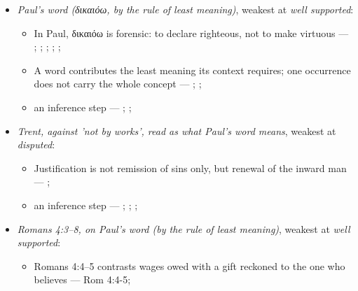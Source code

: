 \documentclass[11pt]{article}
\begin{document}
\begin{itemize}
\begin{itemize}
\item an inference step --- \cite[ad loc. Gal 1:6]{moo-galatians-2013}; \cite[XI.1]{westminster-confession-1647}
\item an inference step --- \cite[XI.1]{westminster-confession-1647}; \cite[III.xi.2]{calvin-institutes-1960}; \cite{morris-apostolic-preaching-1965}
\end{itemize}
\item \emph{Paul's word (δικαιόω, by the rule of least meaning)}, weakest at \emph{well supported}:
\begin{itemize}
\item In Paul, δικαιόω is forensic: to declare righteous, not to make virtuous --- \cite[s.v. δικαιόω]{bauer-danker-lexicon-2000}; \cite{morris-apostolic-preaching-1965}; \cite[p. 80]{moo-romans-1996}; \cite{irons-righteousness-of-god-2015}; \cite{wright-justification-2009}; \cite[ad loc. Rom 3:24]{fitzmyer-romans-1993}
\item A word contributes the least meaning its context requires; one occurrence does not carry the whole concept --- \cite{silva-biblical-words-1994}; \cite{joos-semantic-axiom-1972}; \cite{barr-semantics-2004}
\item an inference step --- \cite{silva-biblical-words-1994}; \cite[p. 80]{moo-romans-1996}; \cite{barr-semantics-2004}
\end{itemize}
\item \emph{Trent, against 'not by works', read as what Paul's word means}, weakest at \emph{disputed}:
\begin{itemize}
\item Justification is not remission of sins only, but renewal of the inward man --- \cite[Trent, Session VI (1547), Decree on Justification, ch. 7]{tanner-decrees-1990}; \cite[Trent, Session VI (1547), canon 11]{tanner-decrees-1990}
\item an inference step --- \cite[Trent, Session VI (1547), Decree on Justification, ch. 8]{tanner-decrees-1990}; \cite[Trent, Session VI (1547), Decree on Justification, ch. 7]{tanner-decrees-1990}; \cite[On the Spirit and the Letter, ch. 45 (26.45)]{npnf1-05-1887}; \cite{mcgrath-iustitia-dei-2005}
\end{itemize}
\item \emph{Romans 4:3–8, on Paul's word (by the rule of least meaning)}, weakest at \emph{well supported}:
\begin{itemize}
\item Romans 4:4–5 contrasts wages owed with a gift reckoned to the one who believes --- Rom 4:4-5; \cite[III.xi.18]{calvin-institutes-1960}

\end{itemize}
\end{itemize}
\end{document}
